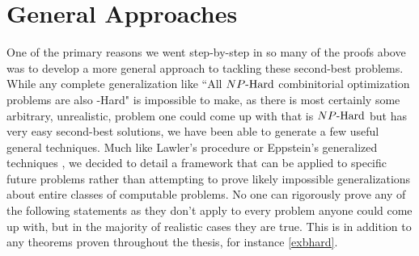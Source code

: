 \section{General Approaches}
One of the primary reasons we went step-by-step in so many of the proofs above was to develop a more general approach to tackling these second-best problems. While any complete generalization like ``All ${NP\text{-Hard{}}}$ combinitorial optimization problems are also \inob{}-Hard" is impossible to make, as there is most certainly some arbitrary, unrealistic, problem one could come up with that is ${NP\text{-Hard{}}}$ but has very easy second-best solutions, we have been able to generate a few useful general techniques. Much like Lawler's procedure \cite{lawler1972procedure} or Eppstein's generalized techniques \cite{eppstein2014k}, we decided to detail a framework that can be applied to specific future problems rather than attempting to prove likely impossible generalizations about entire classes of computable problems. No one can rigorously prove any of the following statements as they don't apply to every problem anyone could come up with, but in the majority of realistic cases they are true. This is in addition to any theorems proven throughout the thesis, for instance \autoref{exbhard}.


